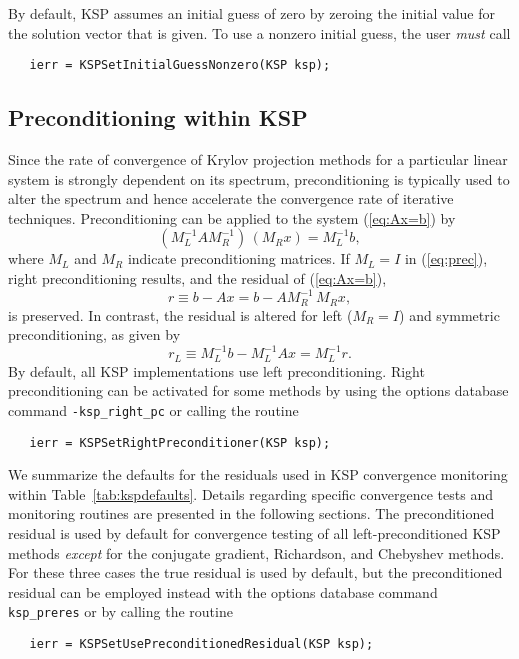 By default, KSP assumes an initial guess of zero by zeroing the initial 
value for the solution vector that is given. To use a nonzero 
initial guess, the user {\em must} call 
\begin{verbatim}
   ierr = KSPSetInitialGuessNonzero(KSP ksp);
\end{verbatim}

\subsection{Preconditioning within KSP} 
\label{sec:ksppc}

Since the rate of convergence of Krylov projection methods for a
particular linear system is strongly dependent on its spectrum,
preconditioning is typically used to alter the spectrum and hence
accelerate the convergence rate of iterative techniques.
Preconditioning can be applied to the system (\ref{eq:Ax=b}) by
\begin{equation}
   (M_L^{-1} A M_R^{-1}) \, (M_R x) = M_L^{-1} b,
\label{eq:prec}
\end{equation}
where $M_L$ and $M_R$ indicate preconditioning matrices.  If $M_L = I$
in (\ref{eq:prec}), right preconditioning results, and the
residual of (\ref{eq:Ax=b}),
  \[ r \equiv b - Ax = b - A M_R^{-1} \, M_R x, \]
is preserved.  In contrast, the residual is altered for left 
($M_R = I$) and symmetric preconditioning, as given by
  \[ r_L \equiv M_L^{-1} b - M_L^{-1} A x = M_L^{-1} r. \]
By default, all KSP implementations use left preconditioning.  
Right preconditioning can be activated for some methods by
using the options database command {\tt -ksp\_right\_pc} or
calling the routine 
\begin{verbatim}
   ierr = KSPSetRightPreconditioner(KSP ksp);
\end{verbatim}

We summarize the defaults for the residuals used in KSP convergence
monitoring within Table~\ref{tab:kspdefaults}.  Details regarding
specific convergence tests and monitoring routines are presented in
the following sections.  The preconditioned residual is used by
default for convergence testing of all left-preconditioned KSP
methods {\em except} for the conjugate gradient, Richardson, and
Chebyshev methods.  For these three cases the true residual is used by
default, but the preconditioned residual can be employed instead with
the options database command {\tt ksp\_preres} or by calling the routine
\begin{verbatim}
   ierr = KSPSetUsePreconditionedResidual(KSP ksp);
\end{verbatim}

